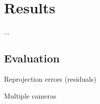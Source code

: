 \chapter{Results}
\label{chapter:results}

...

\section{Evaluation}



Reprojection errors (residuals)


Multiple cameras